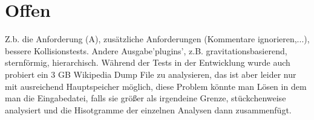 \section{Offen}
Z.b. die Anforderung (A), zusätzliche Anforderungen (Kommentare ignorieren,...), bessere Kollisionstests.
Andere Ausgabe'plugins', z.B. gravitationsbasierend, sternförmig, hierarchisch.
Während der Tests in der Entwicklung wurde auch probiert ein 3 GB Wikipedia Dump File zu analysieren,
das ist aber leider nur mit ausreichend Hauptspeicher möglich, diese Problem könnte man Lösen 
in dem man die Eingabedatei, falls sie größer als irgendeine Grenze, stückchenweise analysiert und die Hisotgramme 
der einzelnen Analysen dann zusammenfügt.


